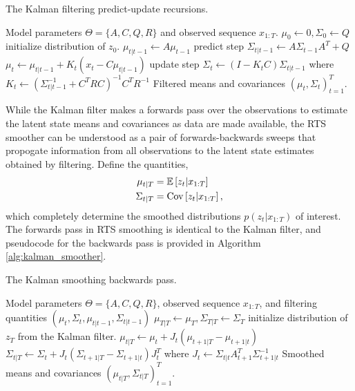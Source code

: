 \documentclass[14pt]{extreport}
\begin{document}
\begin{algorithm}
   \caption{The Kalman filtering predict-update recursions.}
   \label{alg:kalman_filter}
\begin{algorithmic}
   Model parameters $\Theta = \{A, C, Q, R\}$ and
    observed sequence $x_{1:T}$.
    \STATE $\mu_{0} \leftarrow 0, \Sigma_{0} \leftarrow Q$ \hfill initialize distribution of
    $z_{0}$.
    \STATE $\mu_{t \vert t - 1} \leftarrow A\mu_{t - 1}$ \hfill predict step
    \STATE $\Sigma_{t \vert t - 1} \leftarrow A \Sigma_{t - 1} A^{T} + Q$
    \STATE $\mu_{t} \leftarrow \mu_{t \vert t - 1} + K_{t}\left(x_{t} - C\mu_{t \vert t - 1}\right)$ \hfill update step
    \STATE $\Sigma_{t} \leftarrow \left(I - K_{t}C\right)\Sigma_{t \vert t - 1}$
    \STATE where $K_{t} \leftarrow \left(\Sigma_{t \vert t - 1}^{-1} + C^{T}R C\right)^{-1} C^{T}R^{-1}$
    \ENDFOR
     Filtered means and covariances $\left(\mu_{t},
    \Sigma_{t}\right)_{t = 1}^{T}$.
\end{algorithmic}
\end{algorithm}
While the Kalman filter makes a forwards pass over the observations to estimate
the latent state means and covariances as data are made available, the RTS
smoother can be understood as a pair of forwards-backwards sweeps that propogate
information from all observations to the latent state estimates obtained by
filtering. Define the quantities,
\begin{align*}
\mu_{t \vert T} &= \mathbb{E}\left[{z_{t} \vert x_{1:T}}\right] \\
\Sigma_{t \vert T} &= \mathrm{Cov}\left[{z_{t} \vert x_{1:T}}\right],
\end{align*}
which completely determine the smoothed distributions $p\left(z_{t} \vert
x_{1:T}\right)$ of interest. The forwards pass in RTS smoothing is identical to
the Kalman filter, and pseudocode for the backwards pass is provided in
Algorithm \ref{alg:kalman_smoother}.

\begin{algorithm}
   \caption{The Kalman smoothing backwards pass.}
   \label{alg:kalman_smoother}
\begin{algorithmic}
   Model parameters $\Theta = \{A, C, Q, R\}$,
    observed sequence $x_{1:T}$, and filtering quantities $\left(\mu_{t},
    \Sigma_{t}, \mu_{t \vert t - 1}, \Sigma_{t \vert t - 1}\right)$
    \STATE $\mu_{T \vert T} \leftarrow \mu_{T}, \Sigma_{T \vert T} \leftarrow
    \Sigma_{T}$ \hfill initialize distribution of $z_{T}$ from the Kalman
    filter.
    \STATE $\mu_{t \vert T} \leftarrow \mu_{t} + J_{t}\left(\mu_{t + 1 \vert T} - \mu_{t + 1 \vert t}\right)$
    \STATE $\Sigma_{t \vert T} \leftarrow \Sigma_{t} + J_{t}\left(\Sigma_{t + 1 \vert T} - \Sigma_{t + 1 \vert t}\right)J_{t}^{T}$
    \STATE where $J_{t} \leftarrow \Sigma_{t \vert t}A_{t + 1}^{T} \Sigma_{t + 1\vert t}^{-1}$
    \ENDFOR
     Smoothed means and covariances $\left(\mu_{t \vert T},
    \Sigma_{t \vert T}\right)_{t = 1}^{T}$.
\end{algorithmic}
\end{algorithm}
\end{document}
